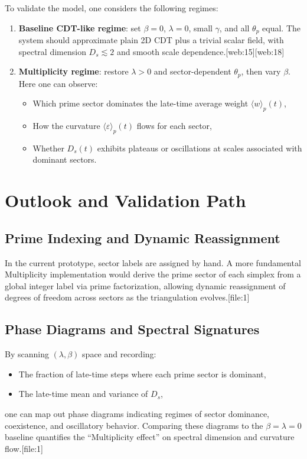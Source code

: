 \documentclass[11pt]{article}
\begin{document}
To validate the model, one considers the following regimes:
\begin{enumerate}[label=(\alph*)]
  \item \textbf{Baseline CDT-like regime}: set \(\beta = 0\), \(\lambda = 0\),
        small \(\gamma\), and all \(\theta_p\) equal. The system should
        approximate plain 2D CDT plus a trivial scalar field, with spectral
        dimension \(D_s \lesssim 2\) and smooth scale dependence.[web:15][web:18]
  \item \textbf{Multiplicity regime}: restore \(\lambda > 0\) and
        sector-dependent \(\theta_p\), then vary \(\beta\). Here one can
        observe:
        \begin{itemize}
          \item Which prime sector dominates the late-time average weight
                \(\langle w \rangle_p(t)\),
          \item How the curvature \(\langle \varepsilon \rangle_p(t)\) flows
                for each sector,
          \item Whether \(D_s(t)\) exhibits plateaus or oscillations at
                scales associated with dominant sectors.
        \end{itemize}
\end{enumerate}

\section{Outlook and Validation Path}

\subsection{Prime Indexing and Dynamic Reassignment}

In the current prototype, sector labels are assigned by hand. A more
fundamental Multiplicity implementation would derive the prime sector of
each simplex from a global integer label via prime factorization, allowing
dynamic reassignment of degrees of freedom across sectors as the
triangulation evolves.[file:1]

\subsection{Phase Diagrams and Spectral Signatures}

By scanning \((\lambda,\beta)\) space and recording:
\begin{itemize}
  \item The fraction of late-time steps where each prime sector is
        dominant,
  \item The late-time mean and variance of \(D_s\),
\end{itemize}
one can map out phase diagrams indicating regimes of sector dominance,
coexistence, and oscillatory behavior. Comparing these diagrams to the
\(\beta=\lambda=0\) baseline quantifies the ``Multiplicity effect'' on
spectral dimension and curvature flow.[file:1]
\end{document}
